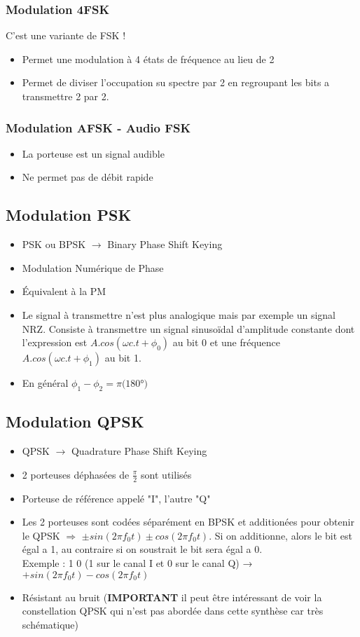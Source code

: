 \documentclass[a4paper]{article}
\begin{document}
\subsubsection{Modulation 4FSK}
C'est une variante de FSK !\\
\begin{itemize}
    \item Permet une modulation à 4 états de fréquence au lieu de 2
    \item Permet de diviser l'occupation su spectre par 2 en regroupant les bits a transmettre 2 par 2.
\end{itemize}
\subsubsection{Modulation AFSK - Audio FSK}
\begin{itemize}
    \item La porteuse est un signal audible
    \item Ne permet pas de débit rapide
\end{itemize}
\subsection{Modulation PSK}
\begin{itemize}
    \item PSK ou BPSK $\rightarrow$ Binary Phase Shift Keying
    \item Modulation Numérique de Phase
    \item Équivalent à la PM
    \item Le signal à transmettre n'est plus analogique mais par exemple un signal NRZ. 
Consiste à transmettre un signal sinusoïdal d’amplitude constante dont l’expression est $A.cos(\omega c.t+ \phi_0)$ au bit 0 et une fréquence $A.cos(\omega c.t+ \phi_1)$ au bit 1.
    \item En général $\phi_1 - \phi_2 = \pi (180$°$)$
    
\end{itemize}
\subsection{Modulation QPSK}
\begin{itemize}
    \item QPSK $\rightarrow$ Quadrature Phase Shift Keying
    \item 2 porteuses déphasées de $\frac{\pi}{2}$ sont utilisés
    \item Porteuse de référence appelé "I", l'autre "Q"
    \item Les 2 porteuses sont codées séparément en BPSK et additionées pour obtenir le QPSK $\Rightarrow$ $ \pm sin(2\pi f_0 t) \pm cos(2 \pi f_0 t)$. Si on additionne, alors le bit est égal a 1, au contraire si on soustrait le bit sera égal a 0.\\ 
    Exemple : 1 0 (1 sur le canal I et 0 sur le canal Q) → $+sin(2\pi f_0 t)-cos(2\pi f_0 t)$
    \item Résistant au bruit (\textbf{IMPORTANT} il peut être intéressant de voir la constellation QPSK qui n'est pas abordée dans cette synthèse car très schématique)
\end{itemize}
\end{document}
